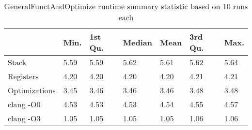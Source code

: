 \begin{table}[h!]
\centering
\begin{tabular}{p{}p{}p{}p{}p{}p{}p{}}
  \hline
 & Min. & 1st Qu. & Median & Mean & 3rd Qu. & Max. \\ 
  \hline
Stack & 5.59 & 5.59 & 5.62 & 5.61 & 5.62 & 5.64 \\ 
  Registers & 4.20 & 4.20 & 4.20 & 4.20 & 4.21 & 4.21 \\ 
  Optimizations & 3.45 & 3.46 & 3.46 & 3.46 & 3.48 & 3.48 \\ 
  clang -O0 & 4.53 & 4.53 & 4.53 & 4.54 & 4.55 & 4.57 \\ 
  clang -O3 & 1.05 & 1.05 & 1.05 & 1.05 & 1.06 & 1.06 \\ 
   \hline
\end{tabular}
\caption{GeneralFunctAndOptimize runtime summary statistic based on 10 runs each}
\end{table}
